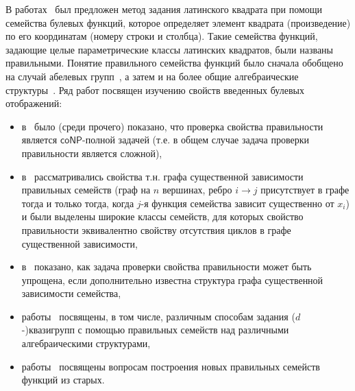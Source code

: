     В работах~\autocite{nosov98, nosov99} был предложен метод задания латинского квадрата при помощи семейства булевых функций, которое определяет элемент квадрата (произведение) по его координатам (номеру строки и столбца).
    Такие семейства функций, задающие целые параметрические классы латинских квадратов, были названы правильными.
    Понятие правильного семейства функций было сначала обобщено на случай абелевых групп~\autocite{nosov06, nosov06abel, nosov07, nosov08, kozlov08}, а затем и на более общие алгебраические структуры~\autocite{plaksina14, galatenko2020latin, galatenko23}.
    Ряд работ посвящен изучению свойств введенных булевых отображений:
    \begin{itemize}
        \item в~\autocite{nosov98} было (среди прочего) показано, что проверка свойства правильности является $\mathsf{coNP}$-полной задачей (т.е. в общем случае задача проверки правильности является сложной),
        \item в~\autocite{nosov07, nosov08, kozlov08} рассматривались свойства т.н. графа существенной зависимости правильных семейств (граф на $n$ вершинах, ребро $ i \to j$ присутствует в графе тогда и только тогда, когда $j$-я функция семейства зависит существенно от $x_i$) и были выделены широкие классы семейств, для которых свойство правильности эквивалентно свойству отсутствия циклов в графе существенной зависимости,
        \item в~\autocite{rykov10, rykov14} показано, как задача проверки свойства правильности может быть упрощена, если дополнительно известна структура графа существенной зависимости семейства,
        \item работы~\autocite{plaksina14, galatenko2020latin, galatenko23} посвящены, в том числе, различным способам задания \mbox{($d$-)квазигрупп} с помощью правильных семейств над различными алгебраическими структурами,
        \item работы~\autocite{galatenko21generation, galatenko2022generation} посвящены вопросам построения новых правильных семейств функций из старых.
    \end{itemize}

